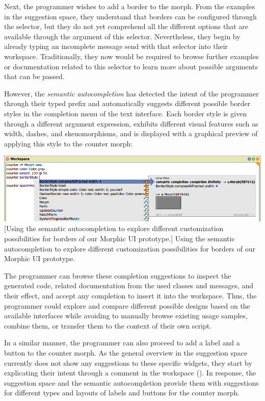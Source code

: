 Next, the programmer wishes to add a border to the morph.
From the examples in the suggestion space, they understand that borders can be configured through the  selector, but they do not yet comprehend all the different options that are available through the argument of this selector.
Nevertheless, they begin by already typing an incomplete message send with that selector into their workspace.
Traditionally, they now would be required to browse further examples or documentation related to this selector to learn more about possible arguments that can be passed.

However, the \emph{semantic autocompletion} has detected the intent of the programmer through their typed prefix and automatically suggests different possible border styles in the completion menu of the text interface.
Each border style is given through a different argument expression, exhibits different visual features such as width, dashes, and skeuomorphisms, and is displayed with a graphical preview of applying this style to the counter morph:

\begin{center}
	\includegraphics[width=\linewidth]{01_suggestions/semantic_autocompletion.png} %
	[Using the semantic autocompletion to explore different customization possibilities for borders of our Morphic UI prototype.]{
		Using the semantic autocompletion to explore different customization possibilities for borders of our Morphic UI prototype.
	}
\end{center}

The programmer can browse these completion suggestions to inspect the generated code, related documentation from the used classes and messages, and their effect, and accept any completion to insert it into the workspace.
Thus, the programmer could explore and compare different possible designs based on the available interfaces while avoiding to manually browse existing usage samples, combine them, or transfer them to the context of their own script.

In a similar manner, the programmer can also proceed to add a label and a button to the counter morph.
As the general overview in the suggestion space currently does not show any suggestions to these specific widgets, they start by explicating their intent through a comment in the workspace ().
In response, the suggestion space and the semantic autocompletion provide them with suggestions for different types and layouts of labels and buttons for the counter morph.

